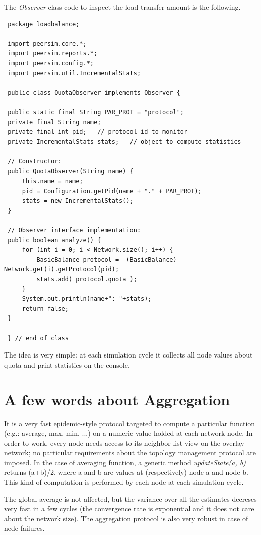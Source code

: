 \documentclass[a4paper,11pt]{article}
\begin{document}
The \emph{Observer} class code to inspect the load transfer amount
is the following. \\

\footnotesize
\begin{verbatim}
 package loadbalance;
 
 import peersim.core.*;
 import peersim.reports.*;
 import peersim.config.*;
 import peersim.util.IncrementalStats;
 
 public class QuotaObserver implements Observer {
 
 public static final String PAR_PROT = "protocol";
 private final String name;   
 private final int pid;   // protocol id to monitor
 private IncrementalStats stats;   // object to compute statistics
 
 // Constructor:
 public QuotaObserver(String name) {
     this.name = name;
     pid = Configuration.getPid(name + "." + PAR_PROT);
     stats = new IncrementalStats();
 }
 
 // Observer interface implementation:
 public boolean analyze() {
     for (int i = 0; i < Network.size(); i++) {
         BasicBalance protocol =  (BasicBalance) Network.get(i).getProtocol(pid);
         stats.add( protocol.quota );
     }
     System.out.println(name+": "+stats);
     return false;
 }
 
 } // end of class
\end{verbatim}
\normalsize


The idea is very simple: at each simulation cycle it collects all
node values about quota and print statistics on the console.


\section{\label{sec:Appendix-A-aggregation}A few words about
Aggregation}

It is a very fast epidemic-style protocol targeted to compute a particular
function (e.g.: average, max, min, ...) on a numeric value holded
at each network node. In order to work, every node needs access to
its neighbor list view on the overlay network; no particular requirements
about the topology management protocol are imposed. In the case of
averaging function, a generic method \emph{updateState(a, b)} returns
(a+b)/2, where a and b are values at (respectively) node a and node
b. This kind of computation is performed by each node at each simulation
cycle.

The global average is not affected, but the variance over all the
estimates decreses very fast in a few cycles (the convergence rate
is exponential and it does not care about the network size). The aggregation
protocol is also very robust in case of nede failures. 
\end{document}
